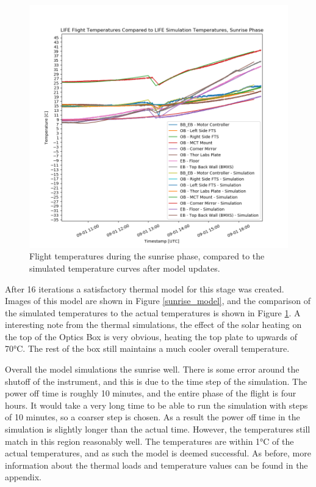 \begin{figure}
    \centering
    \includegraphics[width=\textwidth]{chap4_images/sunrise_images/sunrise_with_sim_temps.png}
    \caption{Flight temperatures during the sunrise phase, compared to the simulated temperature curves after model updates.}
    \label{fig:sunrise_temps_with_sims}
\end{figure}

After 16 iterations a satisfactory thermal model for this stage was created. Images of this model are shown in Figure \ref{sunrise_model}, and the comparison of the simulated temperatures to the actual temperatures is shown in Figure \ref{fig:sunrise_temps_with_sims}. A interesting note from the thermal simulations, the effect of the solar heating on the top of the Optics Box is very obvious, heating the top plate to upwards of 70°C. The rest of the box still maintains a much cooler overall temperature.

Overall the model simulations the sunrise well. There is some error around the shutoff of the instrument, and this is due to the time step of the simulation. The power off time is roughly 10 minutes, and the entire phase of the flight is four hours. It would take a very long time to be able to run the simulation with steps of 10 minutes, so a coarser step is chosen. As a result the power off time in the simulation is slightly longer than the actual time. However, the temperatures still match in this region reasonably well. The temperatures are within 1°C of the actual temperatures, and as such the model is deemed successful. As before, more information about the thermal loads and temperature values can be found in the appendix.


